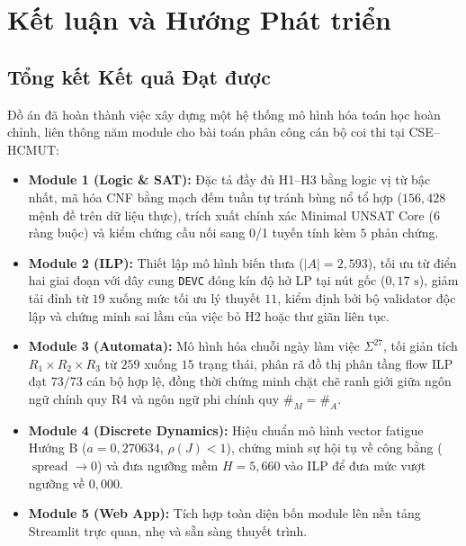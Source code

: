 \section{Kết luận và Hướng Phát triển}
\label{sec:conclusion}

\subsection{Tổng kết Kết quả Đạt được}
Đồ án đã hoàn thành việc xây dựng một hệ thống mô hình hóa toán học hoàn chỉnh, liên thông năm module cho bài toán phân công cán bộ coi thi tại CSE--HCMUT:
\begin{itemize}
    \item \textbf{Module 1 (Logic \& SAT):} Đặc tả đầy đủ H1--H3 bằng logic vị từ bậc nhất, mã hóa CNF bằng mạch đếm tuần tự tránh bùng nổ tổ hợp ($156{,}428$ mệnh đề trên dữ liệu thực), trích xuất chính xác Minimal UNSAT Core ($6$ ràng buộc) và kiểm chứng cầu nối sang 0/1 tuyến tính kèm $5$ phản chứng.
    \item \textbf{Module 2 (ILP):} Thiết lập mô hình biến thưa ($|A|=2{,}593$), tối ưu từ điển hai giai đoạn với dây cung \texttt{DEVC} đóng kín độ hở LP tại nút gốc ($0{,}17\text{ s}$), giảm tải đỉnh từ $19$ xuống mức tối ưu lý thuyết $11$, kiểm định bởi bộ validator độc lập và chứng minh sai lầm của việc bỏ H2 hoặc thư giãn liên tục.
    \item \textbf{Module 3 (Automata):} Mô hình hóa chuỗi ngày làm việc $\Sigma^{27}$, tối giản tích $R_1 \times R_2 \times R_3$ từ $259$ xuống $15$ trạng thái, phân rã đồ thị phân tầng flow ILP đạt $73/73$ cán bộ hợp lệ, đồng thời chứng minh chặt chẽ ranh giới giữa ngôn ngữ chính quy R4 và ngôn ngữ phi chính quy $\#_M = \#_A$.
    \item \textbf{Module 4 (Discrete Dynamics):} Hiệu chuẩn mô hình vector fatigue Hướng B ($a = 0{,}270634$, $\rho(J) < 1$), chứng minh sự hội tụ về công bằng ($\operatorname{spread} \to 0$) và đưa ngưỡng mềm $H = 5{,}660$ vào ILP để đưa mức vượt ngưỡng về $0{,}000$.
    \item \textbf{Module 5 (Web App):} Tích hợp toàn diện bốn module lên nền tảng Streamlit trực quan, nhẹ và sẵn sàng thuyết trình.
\end{itemize}

